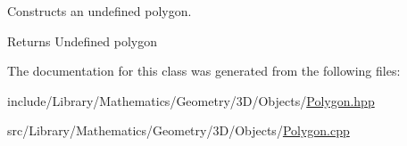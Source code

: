 Constructs an undefined polygon. 

\begin{DoxyReturn}{Returns}
Undefined polygon 
\end{DoxyReturn}


The documentation for this class was generated from the following files\+:\begin{DoxyCompactItemize}
\item 
include/\+Library/\+Mathematics/\+Geometry/3\+D/\+Objects/\hyperlink{3_d_2_objects_2_polygon_8hpp}{Polygon.\+hpp}\item 
src/\+Library/\+Mathematics/\+Geometry/3\+D/\+Objects/\hyperlink{3_d_2_objects_2_polygon_8cpp}{Polygon.\+cpp}\end{DoxyCompactItemize}

